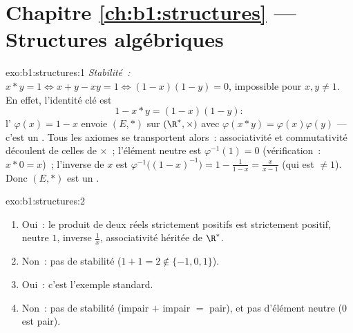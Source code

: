 \section*{Chapitre \ref{ch:b1:structures} --- Structures algébriques}

\begin{solution}{exo:b1:structures:1}
\emph{Stabilité~:} $x * y = 1 \iff x + y - xy = 1 \iff (1-x)(1-y) = 0$,
impossible pour $x, y \neq 1$. En effet, l'identité clé est
\[
1 - x * y = (1 - x)(1 - y):
\]
l' $\varphi(x) = 1 - x$ envoie $(E, *)$ sur $(\R^*, \times)$
avec $\varphi(x * y) = \varphi(x)\varphi(y)$ --- c'est un 
. Tous les axiomes se transportent alors~: associativité et
commutativité découlent de celles de $\times$~; l'élément neutre est
$\varphi^{-1}(1) = 0$ (vérification~: $x * 0 = x$)~; l'inverse de $x$
est $\varphi^{-1}\bigl((1-x)^{-1}\bigr) =
1 - \frac{1}{1-x} = \frac{x}{x - 1}$ (qui est $\neq 1$). Donc $(E, *)$
est un .
\end{solution}

\begin{solution}{exo:b1:structures:2}
\begin{enumerate}
  \item Oui~: le produit de deux réels strictement positifs est
        strictement positif, neutre $1$, inverse $\frac 1x$,
        associativité héritée de $\R^*$.
  \item Non~: pas de stabilité ($1 + 1 = 2 \notin \{-1,0,1\}$).
  \item Oui~: c'est l'exemple standard.
  \item Non~: pas de stabilité (impair $+$ impair $=$ pair), et pas
        d'élément neutre ($0$ est pair).
\end{enumerate}
\end{solution}

